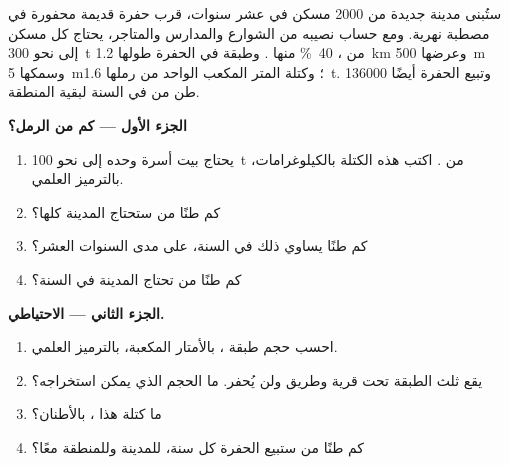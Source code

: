 \begin{problem}
\label{pb:g9:earth-resources:1}
ستُبنى مدينة جديدة من \num{2000} مسكن في عشر سنوات، قرب حفرة  قديمة
محفورة في  مصطبة نهرية. ومع حساب نصيبه من الشوارع والمدارس
والمتاجر، يحتاج كل مسكن إلى نحو \qty{300}{t} من ،
\qty{40}{\%} منها . وطبقة  في الحفرة طولها \qty{1.2}{km}
وعرضها \qty{500}{m} وسمكها \qty{5}{m}؛ وكتلة المتر المكعب الواحد من
رملها \qty{1.6}{t}. وتبيع الحفرة أيضًا \num{136000} طن من  في
السنة لبقية المنطقة.

\noindent\textbf{الجزء الأول --- كم من الرمل؟}\par\nopagebreak
\begin{enumerate}[beginpenalty=10000]
  \item يحتاج بيت أسرة وحده إلى نحو \qty{100}{t} من . اكتب
        هذه الكتلة بالكيلوغرامات، بالترميز العلمي.
  \item كم طنًا من  ستحتاج المدينة كلها؟
  \item كم طنًا يساوي ذلك في السنة، على مدى السنوات العشر؟
  \item كم طنًا من  تحتاج المدينة في السنة؟
\end{enumerate}

\noindent\textbf{الجزء الثاني --- الاحتياطي.}\par\nopagebreak
\begin{enumerate}[resume, beginpenalty=10000]
  \item احسب حجم طبقة ، بالأمتار المكعبة، بالترميز
        العلمي.
  \item يقع ثلث الطبقة تحت قرية وطريق ولن يُحفر. ما الحجم
        الذي يمكن استخراجه؟
  \item ما كتلة هذا ، بالأطنان؟
  \item كم طنًا من  ستبيع الحفرة كل سنة، للمدينة وللمنطقة
        معًا؟
\end{enumerate}


\end{problem}
